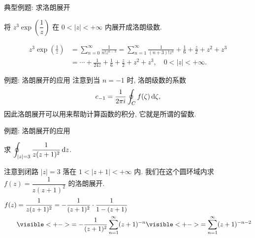 \begin{frame}{典型例题: 求洛朗展开}
\begin{exercise}
将 $z^3\exp\left(\dfrac1z\right)$ 在 $0<|z|<+\infty$ 内展开成洛朗级数.
\end{exercise}
\begin{answer}
\vspace{-\baselineskip}
\begin{align*}
z^3\exp\left(\frac1z\right)&=\sum_{n=0}^\infty\frac{1}{n!z^{n-3}}
=\sum_{n=1}^\infty\frac1{(n+3)! z^n}+\frac16+\frac z2+z^2+z^3\\
&=\cdots+\frac1{24z}+\frac16+\frac z2+z^2+z^3,\quad 0<|z|<+\infty.
\end{align*}
\end{answer}
\end{frame}


\begin{frame}{例题: 洛朗展开的应用}
\onslide<+->
注意到当 $n=-1$ 时, 洛朗级数的系数
\[c_{-1}=\frac1{2\pi i}\oint_C f(\zeta)\,\mathrm{d}\zeta,\]
\onslide<+->
因此洛朗展开可以用来帮助计算函数的积分,
\onslide<+->
它就是所谓的\alert{留数}.
\end{frame}


\begin{frame}{例题: 洛朗展开的应用}
\onslide<+->
\begin{example}
求 $\displaystyle\oint_{|z|=3}\frac1{z(z+1)^2}\,\mathrm{d} z$.
\end{example}
\onslide<+->
\begin{solution}
注意到闭路 $|z|=3$ 落在 $1<|z+1|<+\infty$ 内.
\onslide<+->
我们在这个圆环域内求 $f(z)=\dfrac1{z(z+1)^2}$ 的洛朗展开.
\onslide<+->
\vspace{-0.8\baselineskip}
\begin{align*}
f(z)&=\frac1{z(z+1)^2}=-\frac1{(z+1)^2}\cdot\frac1{1-(z+1)}\\
&\visible<+->{=-\frac1{(z+1)^2}\sum_{n=1}^{\infty}(z+1)^{-n}}
\visible<+->{=\sum_{n=1}^{\infty}(z+1)^{-n-2}}
\end{align*}
\end{solution}
\end{frame}



